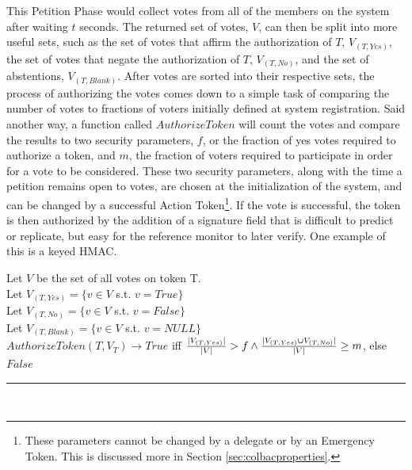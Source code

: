\noindent This Petition Phase would collect votes from all of the members on the
system after waiting $t$ seconds. The returned set of votes, $V$, can then be
split into more useful sets, such as the set of votes that affirm the
authorization of $T$, $V_{(T, Yes)}$, the set of votes that negate the
authorization of $T$, $V_{(T, No)}$, and the set of abstentions,
$V_{(T, Blank)}$. After votes are sorted into their respective sets, the process
of authorizing the votes comes down to a simple task of comparing the number of
votes to fractions of voters initially defined at system registration. Said
another way, a function called $AuthorizeToken$ will count the votes and compare
the results to two security parameters, $f$, or the fraction of yes votes
required to authorize a token, and $m$, the fraction of voters required to
participate in order for a vote to be considered. These two security parameters,
along with the time a petition remains open to votes, are chosen at the
initialization of the system, and can be changed by a successful Action
Token\footnote{These parameters cannot be changed by a delegate or by an
Emergency Token. This is discussed more in Section \ref{sec:colbacproperties}.}.
If the vote is successful, the token is then authorized by the addition of a
signature field that is difficult to predict or replicate, but easy for the
reference monitor to later verify. One example of this is a keyed HMAC.

\begin{definition}
Let $V$ be the set of all votes on token T.\\
Let $V_{(T, Yes)} = \{v \in V$ s.t. $v = True\}$\\
Let $V_{(T, No)} = \{v \in V$ s.t. $v = False\}$\\
Let $V_{(T, Blank)} = \{v \in V$ s.t. $v = NULL\}$\\
$AuthorizeToken(T,V_{T}) \rightarrow True$ iff $\frac{|V_{(T, Yes)}|}{|V|} > f
\wedge \\ \frac{|V_{(T,Yes)} \cup V_{(T, No)}|}{|V|} \ge m$, else $False$\\
\hrule\mbox{}\\
\end{definition}

